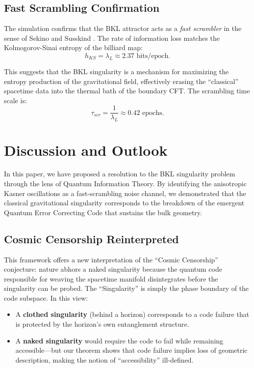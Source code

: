 \documentclass[aps,prd,reprint,nofootinbib,amsmath,amssymb,amsfonts]{revtex4-2}
\begin{document}
\subsection{Fast Scrambling Confirmation}

The simulation confirms that the BKL attractor acts as a \textit{fast scrambler} in the sense of Sekino and Susskind \cite{Sekino2008}. The rate of information loss matches the Kolmogorov-Sinai entropy of the billiard map:
\begin{equation}
    h_{KS} = \lambda_L \approx 2.37 \text{ bits/epoch}.
\end{equation}

This suggests that the BKL singularity is a mechanism for maximizing the entropy production of the gravitational field, effectively erasing the ``classical'' spacetime data into the thermal bath of the boundary CFT. The scrambling time scale is:
\begin{equation}
    \tau_{scr} = \frac{1}{\lambda_L} \approx 0.42 \text{ epochs}.
\end{equation}

\section{Discussion and Outlook}
\label{sec:discussion}

In this paper, we have proposed a resolution to the BKL singularity problem through the lens of Quantum Information Theory. By identifying the anisotropic Kasner oscillations as a fast-scrambling noise channel, we demonstrated that the classical gravitational singularity corresponds to the breakdown of the emergent Quantum Error Correcting Code that sustains the bulk geometry.

\subsection{Cosmic Censorship Reinterpreted}

This framework offers a new interpretation of the ``Cosmic Censorship'' conjecture: nature abhors a naked singularity because the quantum code responsible for weaving the spacetime manifold disintegrates before the singularity can be probed. The ``Singularity'' is simply the phase boundary of the code subspace. In this view:
\begin{itemize}
    \item A \textbf{clothed singularity} (behind a horizon) corresponds to a code failure that is protected by the horizon's own entanglement structure.
    \item A \textbf{naked singularity} would require the code to fail while remaining accessible---but our theorem shows that code failure implies loss of geometric description, making the notion of ``accessibility'' ill-defined.
\end{itemize}
\end{document}

